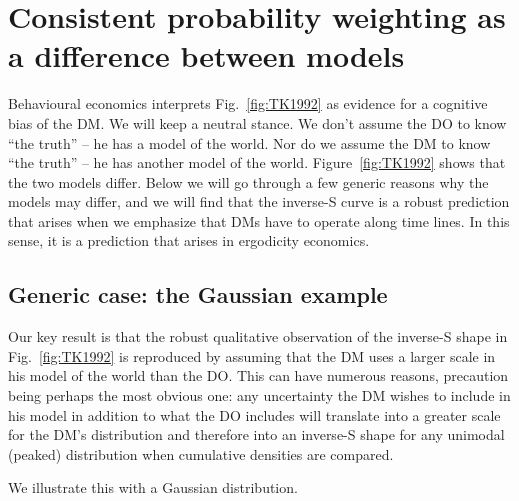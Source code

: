\documentclass[a4paper, 12pt]{article}
\newcommand{\fref}[1]{Fig.~\ref{fig:#1}}
\newcommand{\Fref}[1]{Figure~\ref{fig:#1}}
\newcommand{\seclabel}[1]{\label{sec:#1}}
\newcommand{\MK}[1]{{\it ***MK: #1 MK***}}
\begin{document}


\section{Consistent probability weighting as a difference between models} \seclabel{ModelDiff}

Behavioural economics interprets \fref{TK1992} as evidence for a cognitive bias of the DM. We will keep a neutral stance. We don't assume the DO to know ``the truth'' -- he has a model of the world. Nor do we assume the DM to know ``the truth'' -- he has another model of the world. \Fref{TK1992} shows that the two models differ. Below we will go through a few generic reasons why the models may differ, and we will find that the inverse-S curve is a robust prediction that arises when we emphasize that DMs have to operate along time lines. In this sense, it is a prediction that arises in ergodicity economics.


\subsection{Generic case: the Gaussian example}
Our key result is that the robust qualitative observation of the inverse-S shape in \fref{TK1992} is reproduced by assuming that the DM uses a larger scale in his model of the world than the DO. This can have numerous reasons, precaution being perhaps the most obvious one: any uncertainty the DM wishes to include in his model in addition to what the DO includes will translate into a greater scale for the DM's distribution and therefore into an inverse-S shape for any unimodal (peaked) distribution when cumulative densities are compared.

We illustrate this with a Gaussian distribution.
\end{document}
